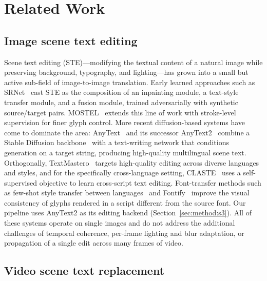 \section{Related Work}
\label{sec:related}

\subsection{Image scene text editing}
\label{sec:related:ste}

Scene text editing (STE)---modifying the textual content of a
natural image while preserving background, typography, and
lighting---has grown into a small but active sub-field of
image-to-image translation. Early learned approaches such as
SRNet~\citep{wu2019srnet} cast STE as the composition of an
inpainting module, a text-style transfer module, and a fusion
module, trained adversarially with synthetic source/target pairs.
MOSTEL~\citep{qu2023mostel} extends this line of work with
stroke-level supervision for finer glyph control. More recent
diffusion-based systems have come to dominate the area:
AnyText~\citep{tuo2024anytext} and its successor
AnyText2~\citep{tuo2025anytext2} combine a Stable Diffusion
backbone~\citep{rombach2022stablediffusion} with a text-writing
network that conditions generation on a target string, producing
high-quality multilingual scene text. Orthogonally,
TextMastero~\citep{wang2024textmastero} targets high-quality
editing across diverse languages and styles, and for the
specifically cross-language setting, CLASTE~\citep{yang2023claste}
uses a self-supervised objective to learn cross-script text
editing. Font-transfer methods such as few-shot style transfer
between languages~\citep{li2021fewshotfont} and
Fontify~\citep{xu2026fontify} improve the visual consistency of
glyphs rendered in a script different from the source font. Our
pipeline uses AnyText2 as its editing backend
(Section~\ref{sec:method:s3}). All of these systems operate on
single images and do not address the additional challenges of
temporal coherence, per-frame lighting and blur adaptation, or
propagation of a single edit across many frames of video.

\subsection{Video scene text replacement}
\label{sec:related:video}

